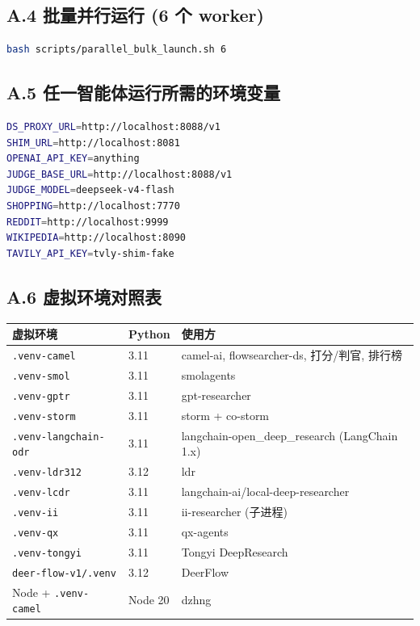 \documentclass[UTF8,a4paper,12pt,oneside]{ctexart}
\begin{document}
\subsection*{A.4 批量并行运行 (6 个 worker)}

\begin{lstlisting}[language=bash]
bash scripts/parallel_bulk_launch.sh 6
\end{lstlisting}

\subsection*{A.5 任一智能体运行所需的环境变量}

\begin{lstlisting}[language=bash]
DS_PROXY_URL=http://localhost:8088/v1
SHIM_URL=http://localhost:8081
OPENAI_API_KEY=anything
JUDGE_BASE_URL=http://localhost:8088/v1
JUDGE_MODEL=deepseek-v4-flash
SHOPPING=http://localhost:7770
REDDIT=http://localhost:9999
WIKIPEDIA=http://localhost:8090
TAVILY_API_KEY=tvly-shim-fake
\end{lstlisting}

\subsection*{A.6 虚拟环境对照表}

\begin{table}[ht]
\centering
\small
\begin{tabular}{l l l}
\toprule
虚拟环境 & Python & 使用方 \\
\midrule
\texttt{.venv-camel} & 3.11 & camel-ai, flowsearcher-ds, 打分/判官, 排行榜 \\
\texttt{.venv-smol} & 3.11 & smolagents \\
\texttt{.venv-gptr} & 3.11 & gpt-researcher \\
\texttt{.venv-storm} & 3.11 & storm + co-storm \\
\texttt{.venv-langchain-odr} & 3.11 & langchain-open\_deep\_research (LangChain 1.x) \\
\texttt{.venv-ldr312} & 3.12 & ldr \\
\texttt{.venv-lcdr} & 3.11 & langchain-ai/local-deep-researcher \\
\texttt{.venv-ii} & 3.11 & ii-researcher (子进程) \\
\texttt{.venv-qx} & 3.11 & qx-agents \\
\texttt{.venv-tongyi} & 3.11 & Tongyi DeepResearch \\
\texttt{deer-flow-v1/.venv} & 3.12 & DeerFlow \\
Node + \texttt{.venv-camel} & Node 20 & dzhng \\
\bottomrule
\end{tabular}
\end{table}
\end{document}
